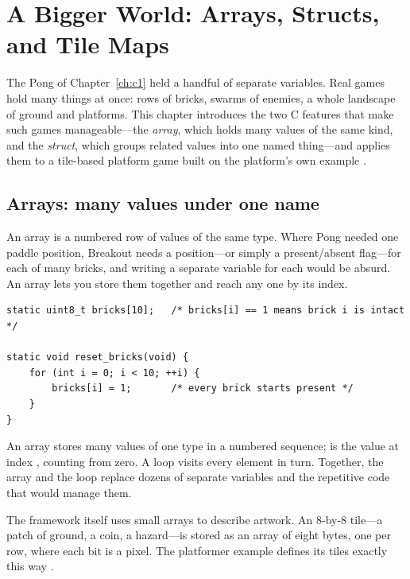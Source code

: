 \chapter{A Bigger World: Arrays, Structs, and Tile Maps}
\label{ch:c2}

The Pong of Chapter~\ref{ch:c1} held a handful of separate variables. Real games
hold many things at once: rows of bricks, swarms of enemies, a whole landscape of
ground and platforms. This chapter introduces the two C features that make such
games manageable---the \emph{array}, which holds many values of the same kind, and
the \emph{struct}, which groups related values into one named thing---and applies
them to a tile-based platform game built on the platform's own example
\citep{prg32repo,prg32tutorialc}.

\section{Arrays: many values under one name}

An array is a numbered row of values of the same type. Where Pong needed one
paddle position, Breakout needs a position---or simply a present/absent flag---for
each of many bricks, and writing a separate variable for each would be absurd. An
array lets you store them together and reach any one by its index.

\begin{lstlisting}[style=c,caption={An array of brick flags. Index $i$ holds whether brick $i$ is still present.}]
static uint8_t bricks[10];   /* bricks[i] == 1 means brick i is intact */

static void reset_bricks(void) {
    for (int i = 0; i < 10; ++i) {
        bricks[i] = 1;       /* every brick starts present */
    }
}
\end{lstlisting}

\begin{prgconcept}
An array stores many values of one type in a numbered sequence; 
is the value at index , counting from zero. A  loop visits every
element in turn. Together, the array and the loop replace dozens of separate
variables and the repetitive code that would manage them.
\end{prgconcept}

The framework itself uses small arrays to describe artwork. An 8-by-8 tile---a
patch of ground, a coin, a hazard---is stored as an array of eight bytes, one per
row, where each bit is a pixel. The platformer example defines its tiles exactly
this way \citep{prg32repo}.

